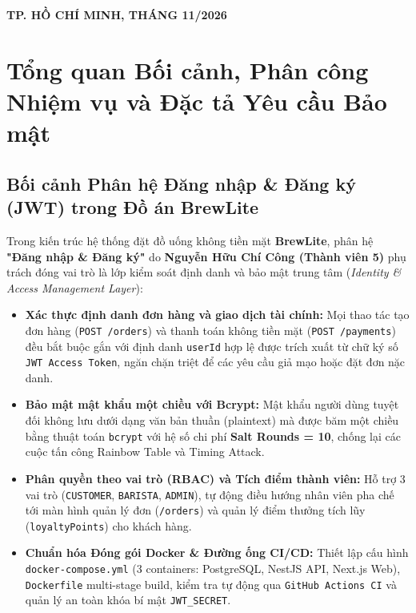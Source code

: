 \documentclass[a4paper]{article}
\begin{document}
\begin{titlepage}
\begin{singlespace}
\vfill
\begin{center}
{\small \textbf{TP. HỒ CHÍ MINH, THÁNG 11/2026}}
\end{center}
\end{singlespace}
\end{titlepage}

\thispagestyle{empty}
\newpage

\tableofcontents
\newpage

\onehalfspacing

\section{Tổng quan Bối cảnh, Phân công Nhiệm vụ và Đặc tả Yêu cầu Bảo mật}

\subsection{Bối cảnh Phân hệ Đăng nhập \& Đăng ký (JWT) trong Đồ án BrewLite}
Trong kiến trúc hệ thống đặt đồ uống không tiền mặt \textbf{BrewLite}, phân hệ \textbf{"Đăng nhập \& Đăng ký"} do \textbf{Nguyễn Hữu Chí Công (Thành viên 5)} phụ trách đóng vai trò là lớp kiểm soát định danh và bảo mật trung tâm (\textit{Identity \& Access Management Layer}):
\begin{itemize}
    \item \textbf{Xác thực định danh đơn hàng và giao dịch tài chính:} Mọi thao tác tạo đơn hàng (\texttt{POST /orders}) và thanh toán không tiền mặt (\texttt{POST /payments}) đều bắt buộc gắn với định danh \texttt{userId} hợp lệ được trích xuất từ chữ ký số \texttt{JWT Access Token}, ngăn chặn triệt để các yêu cầu giả mạo hoặc đặt đơn nặc danh.
    \item \textbf{Bảo mật mật khẩu một chiều với Bcrypt:} Mật khẩu người dùng tuyệt đối không lưu dưới dạng văn bản thuần (plaintext) mà được băm một chiều bằng thuật toán \texttt{bcrypt} với hệ số chi phí \textbf{Salt Rounds = 10}, chống lại các cuộc tấn công Rainbow Table và Timing Attack.
    \item \textbf{Phân quyền theo vai trò (RBAC) và Tích điểm thành viên:} Hỗ trợ 3 vai trò (\texttt{CUSTOMER}, \texttt{BARISTA}, \texttt{ADMIN}), tự động điều hướng nhân viên pha chế tới màn hình quản lý đơn (\texttt{/orders}) và quản lý điểm thưởng tích lũy (\texttt{loyaltyPoints}) cho khách hàng.
    \item \textbf{Chuẩn hóa Đóng gói Docker \& Đường ống CI/CD:} Thiết lập cấu hình \texttt{docker-compose.yml} (3 containers: PostgreSQL, NestJS API, Next.js Web), \texttt{Dockerfile} multi-stage build, kiểm tra tự động qua \texttt{GitHub Actions CI} và quản lý an toàn khóa bí mật \texttt{JWT\_SECRET}.
\end{itemize}
\end{document}
